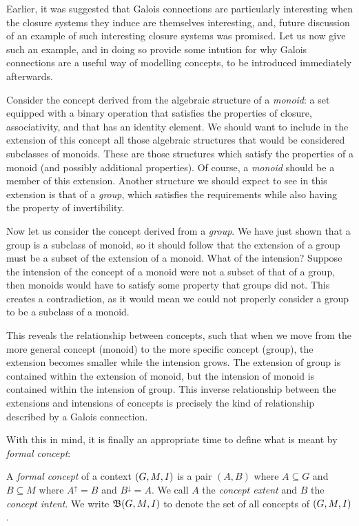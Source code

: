 Earlier, it was suggested that Galois connections are particularly interesting when the closure systems they induce are
themselves interesting, and, future discussion of an example of such interesting closure systems was promised. Let us now
give such an example, and in doing so provide some intution for why Galois connections are a useful way of modelling
concepts, to be introduced immediately afterwards.

Consider the concept derived from the algebraic structure of a \textit{monoid}: a set equipped with a binary operation that
satisfies the properties of closure, associativity, and that has an identity element. We should want to include in the
extension of this concept all those algebraic structures that would be considered subclasses of monoids. These are those
structures which satisfy the properties of a monoid (and possibly additional properties). Of course, a \textit{monoid}
should be a member of this extension. Another structure we should expect to see in this extension is that of a \textit{group},
which satisfies the requirements while also having the property of invertibility.

Now let us consider the concept derived from a \textit{group}. We have just shown that a group is a subclass of monoid,
so it should follow that the extension of a group must be a subset of the extension of a monoid. What of the intension?
Suppose the intension of the concept of a monoid were not a subset of that of a group, then monoids would have to satisfy
some property that groups did not. This creates a contradiction, as it would mean we could not properly consider a group
to be a subclass of a monoid.

This reveals the relationship between concepts, such that when we move from the more general concept (monoid) to the
more specific concept (group), the extension becomes smaller while the intension grows. The extension of group is
contained within the extension of monoid, but the intension of monoid is contained within the intension of group. This
inverse relationship between the extensions and intensions of concepts is precisely the kind of relationship described
by a Galois connection.

With this in mind, it is finally an appropriate time to define what is meant by \textit{formal concept}:

\begin{definition}
	  \label{definition:formal-concept} A \emph{formal concept} of a
	context $(G,M,\mathrel{I})$ is a pair $(A,B)$ where $A \subseteq G$ and $B\subseteq M$ where $A^{\uparrow}= B$ and
	$B^{\downarrow}= A$. We call $A$ the \emph{concept extent} and $B$ the \emph{concept intent}. We write ${\mathfrak B} (G,M,\mathrel{I})$ to
	denote the set of all concepts of $(G,M,\mathrel{I})$.
\end{definition}

